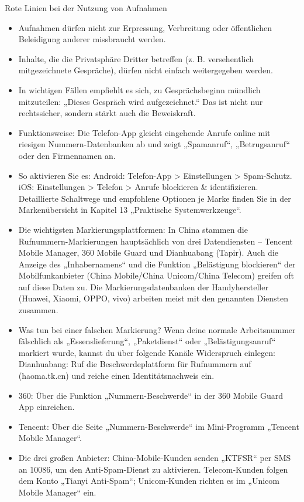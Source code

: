 \begin{tcbwarn}{Rote Linien bei der Nutzung von Aufnahmen}
\begin{itemize}
  \item Aufnahmen dürfen nicht zur Erpressung, Verbreitung oder öffentlichen Beleidigung anderer missbraucht werden.
  \item Inhalte, die die Privatsphäre Dritter betreffen (z. B. versehentlich mitgezeichnete Gespräche), dürfen nicht einfach weitergegeben werden.
  \item In wichtigen Fällen empfiehlt es sich, zu Gesprächsbeginn mündlich mitzuteilen: „Dieses Gespräch wird aufgezeichnet.“ Das ist nicht nur rechtssicher, sondern stärkt auch die Beweiskraft.
\end{itemize}

\end{tcbwarn}


\begin{itemize}
  \item Funktionsweise: Die Telefon-App gleicht eingehende Anrufe online mit riesigen Nummern-Datenbanken ab und zeigt „Spamanruf“, „Betrugsanruf“ oder den Firmennamen an.
  \item So aktivieren Sie es: Android: Telefon-App > Einstellungen > Spam-Schutz. iOS: Einstellungen > Telefon > Anrufe blockieren \& identifizieren. Detaillierte Schaltwege und empfohlene Optionen je Marke finden Sie in der Markenübersicht in Kapitel 13 „Praktische Systemwerkzeuge“.
  \item Die wichtigsten Markierungsplattformen: In China stammen die Rufnummern-Markierungen hauptsächlich von drei Datendiensten – Tencent Mobile Manager, 360 Mobile Guard und Dianhuabang (Tapir). Auch die Anzeige des „Inhabernamens“ und die Funktion „Belästigung blockieren“ der Mobilfunkanbieter (China Mobile/China Unicom/China Telecom) greifen oft auf diese Daten zu. Die Markierungsdatenbanken der Handyhersteller (Huawei, Xiaomi, OPPO, vivo) arbeiten meist mit den genannten Diensten zusammen.
  \item Was tun bei einer falschen Markierung? Wenn deine normale Arbeitsnummer fälschlich als „Essenslieferung“, „Paketdienst“ oder „Belästigungsanruf“ markiert wurde, kannst du über folgende Kanäle Widerspruch einlegen: Dianhuabang: Ruf die Beschwerdeplattform für Rufnummern auf (haoma.tk.cn) und reiche einen Identitätsnachweis ein.
  \item 360: Über die Funktion „Nummern-Beschwerde“ in der 360 Mobile Guard App einreichen.
  \item Tencent: Über die Seite „Nummern-Beschwerde“ im Mini-Programm „Tencent Mobile Manager“.
  \item Die drei großen Anbieter: China-Mobile-Kunden senden „KTFSR“ per SMS an 10086, um den Anti-Spam-Dienst zu aktivieren. Telecom-Kunden folgen dem Konto „Tianyi Anti-Spam“; Unicom-Kunden richten es im „Unicom Mobile Manager“ ein.
\end{itemize}

